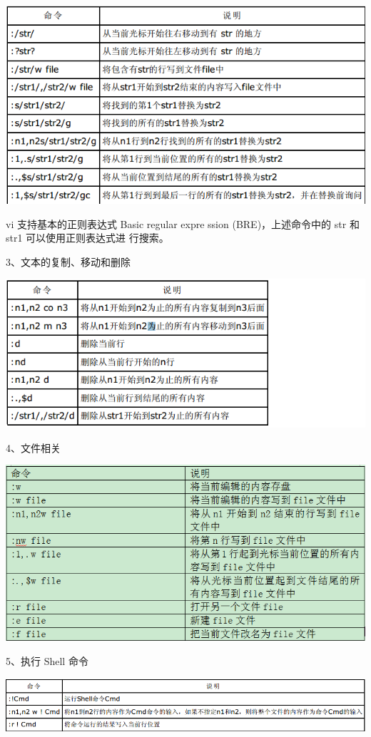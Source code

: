 \documentclass[letterpaper,10pt]{sphinxmanual}
\begin{document}
\includegraphics{str_search.png}

vi 支持基本的正则表达式 Basic regular expre ssion (BRE)，上述命令中的 str 和 str1 可以使用正则表达式进
行搜索。

3、文本的复制、移动和删除

\includegraphics{text_cp.png}

4、文件相关

\includegraphics{file1.png}

5、执行 Shell 命令

\includegraphics{shell.png}
\end{document}
